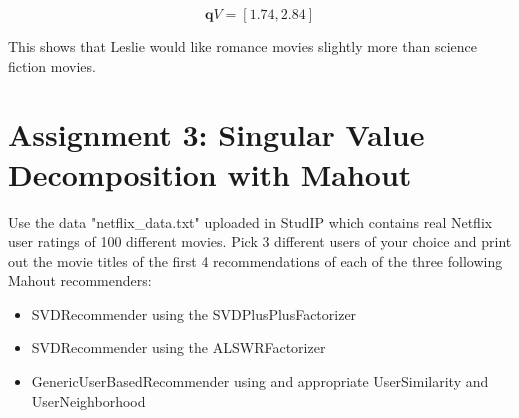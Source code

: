\documentclass{article}
\begin{document}
\[
\mathbf{q}V = [1.74,2.84]
\]

This shows that Leslie would like romance movies slightly more than science fiction movies.

\section{Assignment 3: Singular Value Decomposition with Mahout}
Use the data "netflix\_data.txt" uploaded in StudIP which contains real Netflix user ratings of 100 different movies. Pick 3 different users of your choice and print out the movie titles of the first 4 recommendations of each of the three following Mahout recommenders:
\begin{itemize}
	\item SVDRecommender using the SVDPlusPlusFactorizer
	\item SVDRecommender using the ALSWRFactorizer
	\item GenericUserBasedRecommender using and appropriate UserSimilarity and UserNeighborhood
\end{itemize}
\end{document}
